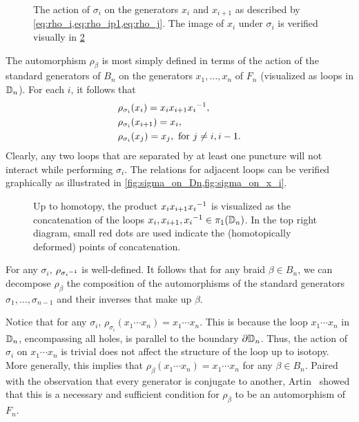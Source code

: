 \begin{figure}[htbp]
    \centering
    
    \caption{The action of $\sigma_i$ on the generators $x_i$ and $x_{i+1}$ as described by \cref{eq:rho_i,eq:rho_ip1,eq:rho_j}. The image of $x_i$ under $\sigma_i$ is verified visually in \cref{fig:sigma_on_x_i}}\label{fig:sigma_on_Dn}
\end{figure}

The automorphism $\rho_\beta$ is most simply defined in terms of the action of the standard generators of $B_n$ on the generators $x_1,\dots,x_n$ of $F_n$ (visualized as loops in $\mathbb{D}_n$). For each $i$, it follows that
\begin{align}
    &\rho_{\sigma_i}(x_{i}) = x_{i}x_{i+1} { x_{i} }^{-1}, \label{eq:rho_i}\\
    &\rho_{\sigma_i}(x_{i+1}) = x_{i}, \label{eq:rho_ip1}\\
    &\rho_{\sigma_i}(x_j) = x_j, \textrm{ for } j\neq i,i-1.\label{eq:rho_j}
\end{align}
Clearly, any two loops that are separated by at least one puncture will not interact while performing $\sigma_i$. The relations for adjacent loops can be verified graphically as illustrated in \cref{fig:sigma_on_Dn,fig:sigma_on_x_i}.
\begin{figure}[htbp]
    \centering
    
    \caption{Up to homotopy, the product $x_i x_{i+1} { x_i }^{-1}$ is visualized as the concatenation of the loops $x_i,x_{i+1},{ x_i }^{-1}\in\pi_1(\mathbb{D}_n)$. In the top right diagram, small red dots are used indicate the (homotopically deformed) points of concatenation.}\label{fig:sigma_on_x_i}
\end{figure}

For any $\sigma_i$, $\rho_{{ \sigma_i }^{-1}}$ is well-defined. It follows that for any braid $\beta\in B_n$, we can decompose $\rho_\beta$ the composition of the automorphisms of the standard generators $\sigma_1,\dots,\sigma_{n-1}$ and their inverses that make up $\beta$. 

Notice that for any $\sigma_i$, $\rho_{\sigma_i}(x_1\cdots x_n) = x_1\cdots x_n$. This is because the loop $x_1\cdots x_n$ in $\mathbb{D}_n$, encompassing all holes, is parallel to the boundary $\partial\mathbb{D}_n$. Thus, the action of $\sigma_i$ on $x_1\cdots x_n$ is trivial does not affect the structure of the loop up to isotopy. More generally, this implies that $\rho_\beta(x_1\cdots x_n) = x_1\cdots x_n$ for any $\beta\in B_n$. Paired with the observation that every generator is conjugate to another, Artin~\cite{Artin1947} showed that this is a necessary and sufficient condition for $\rho_\beta$ to be an automorphism of $F_n$.


